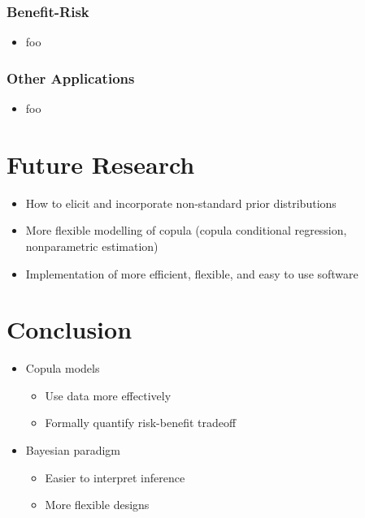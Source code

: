 \documentclass{beamer}
\begin{document}
	
	\begin{frame}
		\frametitle{Benefit-Risk}
		\begin{itemize}
			\setlength\itemsep{1.5em}
			\item foo
		\end{itemize}
	\end{frame}

	\begin{frame}
		\frametitle{Other Applications}
		\begin{itemize}
			\setlength\itemsep{1.5em}
			\item foo
		\end{itemize}
	\end{frame}
	

\section{Future Research}

	\begin{frame}
		\begin{itemize}
			\setlength\itemsep{2em}
			\item How to elicit and incorporate non-standard prior distributions
			\item More flexible modelling of copula (copula conditional regression, nonparametric estimation)
			\item Implementation of more efficient, flexible, and easy to use software 
		\end{itemize}
		\begin{center}
		\end{center}
	\end{frame}

\section{Conclusion}

	\begin{frame}
		\begin{itemize}
			\setlength\itemsep{2em}
			\item Copula models
			\begin{itemize} 
				\item Use data more effectively
				\item Formally quantify risk-benefit tradeoff
			\end{itemize}
			\item Bayesian paradigm
			\begin{itemize}
			 \item Easier to interpret inference
			 \item More flexible designs
			 \end{itemize}
		\end{itemize}			
		\begin{center}
		\end{center}
	\end{frame}
	
\end{document}
